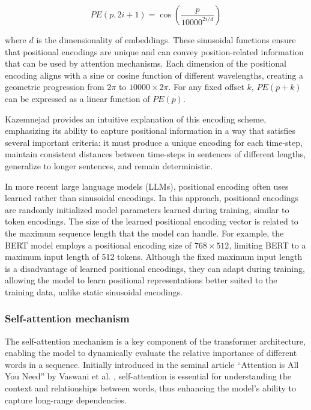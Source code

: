 \begin{equation}
    PE(p, 2i + 1) = \cos\left(\frac{p}{10000^{2i/d}}\right)
\end{equation}

where \( d \) is the dimensionality of embeddings. These sinusoidal functions ensure that positional encodings are unique and can convey position-related information that can be used by attention mechanisms. Each dimension of the positional encoding aligns with a sine or cosine function of different wavelengths, creating a geometric progression from \( 2\pi \) to \( 10000 \times 2\pi \). For any fixed offset \( k \), \( PE(p+k) \) can be expressed as a linear function of \( PE(p) \).

Kazemnejad \cite{kazemnejad2019:pencoding} provides an intuitive explanation of this encoding scheme, emphasizing its ability to capture positional information in a way that satisfies several important criteria: it must produce a unique encoding for each time-step, maintain consistent distances between time-steps in sentences of different lengths, generalize to longer sentences, and remain deterministic.

In more recent large language models (LLMs), positional encoding often uses learned rather than sinusoidal encodings. In this approach, positional encodings are randomly initialized model parameters learned during training, similar to token encodings. The size of the learned positional encoding vector is related to the maximum sequence length that the model can handle. For example, the BERT model \cite{devlin2018bert} employs a positional encoding size of \( 768 \times 512 \), limiting BERT to a maximum input length of 512 tokens. Although the fixed maximum input length is a disadvantage of learned positional encodings, they can adapt during training, allowing the model to learn positional representations better suited to the training data, unlike static sinusoidal encodings.

\subsubsection{Self-attention mechanism}

The self-attention mechanism is a key component of the transformer architecture, enabling the model to dynamically evaluate the relative importance of different words in a sequence. Initially introduced in the seminal article “Attention is All You Need” by Vaswani et al. \cite{vaswani2017attention}, self-attention is essential for understanding the context and relationships between words, thus enhancing the model's ability to capture long-range dependencies.

